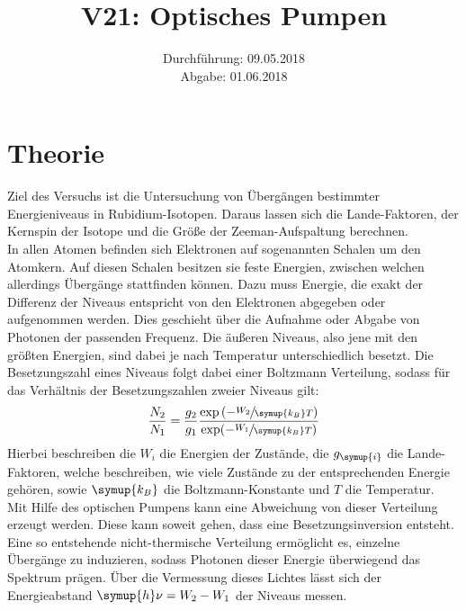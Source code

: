 \documentclass[
  bibliography=totoc,     %
  captions=tableheading,  %
  titlepage=firstiscover, %
]{scrartcl}
\title{V21: Optisches Pumpen}
\author{
  Simon Schulte
  \texorpdfstring{
    \\
    \href{mailto:simon.schulte@udo.edu}{simon.schulte@udo.edu}
  }{}
  \texorpdfstring{\and}{, }
  Tim Sedlaczek
  \texorpdfstring{
    \\
    \href{mailto:tim.sedlaczek@udo.edu}{tim.sedlaczek@udo.edu}
  }{}
}
\date{Durchführung: 09.05.2018\\
      Abgabe: 01.06.2018}
\begin{document}
\maketitle
\thispagestyle{empty}
\setcounter{page}{1}
\section{Theorie}
\label{sec:theorie}
Ziel des Versuchs ist die Untersuchung von Übergängen bestimmter
Energieniveaus in Rubidium-Isotopen. Daraus lassen sich die Lande-Faktoren,
der Kernspin der Isotope und die Größe der Zeeman-Aufspaltung berechnen. \\
In allen Atomen befinden sich Elektronen auf sogenannten Schalen um den
Atomkern. Auf diesen Schalen besitzen sie feste Energien, zwischen welchen
allerdings Übergänge stattfinden können. Dazu muss Energie, die exakt der
Differenz der Niveaus entspricht von den Elektronen abgegeben oder aufgenommen
werden. Dies geschieht über die Aufnahme oder Abgabe von Photonen der
passenden Frequenz. Die äußeren Niveaus, also jene mit den größten Energien,
sind dabei je nach Temperatur unterschiedlich besetzt. Die Besetzungszahl eines
Niveaus folgt dabei einer Boltzmann Verteilung, sodass für das Verhältnis der
Besetzungszahlen zweier Niveaus gilt:
%
\begin{equation}
  \frac{N_2}{N_1}=\frac{g_2}{g_1}\frac{\exp\left(-\sfrac{W_2}{\symup{k_B}T}\right)}{\exp(-\sfrac{W_1}{\symup{k_B}T})}
\end{equation}
%
Hierbei beschreiben die $W_i$ die Energien der Zustände, die $g_{\symup{i}}$ die
Lande-Faktoren, welche beschreiben, wie viele Zustände zu der entsprechenden
Energie gehören, sowie $\symup{k_B}$ die Boltzmann-Konstante und $T$ die
Temperatur. \\
Mit Hilfe des optischen Pumpens kann eine Abweichung von dieser Verteilung
erzeugt werden. Diese kann soweit gehen, dass eine Besetzungsinversion
entsteht. Eine so entstehende nicht-thermische Verteilung ermöglicht es,
einzelne Übergänge zu induzieren, sodass Photonen dieser Energie überwiegend
das Spektrum prägen. Über die Vermessung dieses Lichtes lässt sich der
Energieabstand $\symup{h}\nu=W_2-W_1$ der Niveaus messen.
\end{document}
